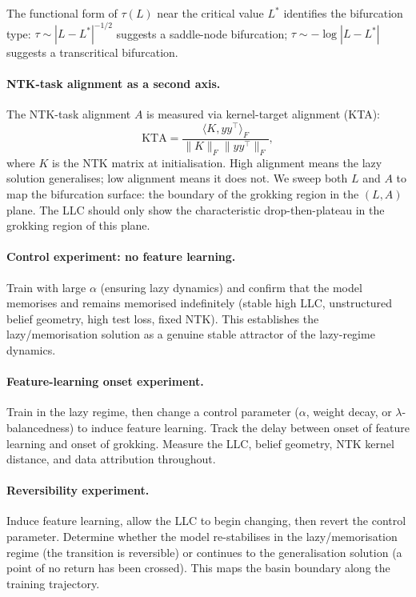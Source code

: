 \documentclass[11pt,a4paper]{article}
\begin{document}
The functional form of $\tau(L)$ near the critical value $L^*$ identifies the bifurcation type: $\tau \sim |L - L^*|^{-1/2}$ suggests a saddle-node bifurcation; $\tau \sim -\log|L - L^*|$ suggests a transcritical bifurcation.

\paragraph{NTK-task alignment as a second axis.} The NTK-task alignment $A$ is measured via kernel-target alignment (KTA):
\begin{equation}
    \mathrm{KTA} = \frac{\langle K, yy^\top \rangle_F}{\|K\|_F \|yy^\top\|_F},
\end{equation}
where $K$ is the NTK matrix at initialisation. High alignment means the lazy solution generalises; low alignment means it does not. We sweep both $L$ and $A$ to map the bifurcation surface: the boundary of the grokking region in the $(L, A)$ plane. The LLC should only show the characteristic drop-then-plateau in the grokking region of this plane.

\paragraph{Control experiment: no feature learning.} Train with large $\alpha$ (ensuring lazy dynamics) and confirm that the model memorises and remains memorised indefinitely (stable high LLC, unstructured belief geometry, high test loss, fixed NTK). This establishes the lazy/memorisation solution as a genuine stable attractor of the lazy-regime dynamics.

\paragraph{Feature-learning onset experiment.} Train in the lazy regime, then change a control parameter ($\alpha$, weight decay, or $\lambda$-balancedness) to induce feature learning. Track the delay between onset of feature learning and onset of grokking. Measure the LLC, belief geometry, NTK kernel distance, and data attribution throughout.

\paragraph{Reversibility experiment.} Induce feature learning, allow the LLC to begin changing, then revert the control parameter. Determine whether the model re-stabilises in the lazy/memorisation regime (the transition is reversible) or continues to the generalisation solution (a point of no return has been crossed). This maps the basin boundary along the training trajectory.
\end{document}
